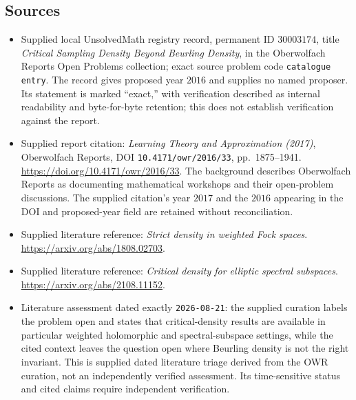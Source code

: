 \documentclass[11pt]{article}
\begin{document}
\subsection{Sources}
\begin{itemize}
\item Supplied local UnsolvedMath registry record, permanent ID \(30003174\), title \emph{Critical Sampling Density Beyond Beurling Density}, in the Oberwolfach Reports Open Problems collection; exact source problem code \texttt{catalogue entry}. The record gives proposed year \(2016\) and supplies no named proposer. Its statement is marked ``exact,'' with verification described as internal readability and byte-for-byte retention; this does not establish verification against the report.
\item Supplied report citation: \emph{Learning Theory and Approximation (2017)}, Oberwolfach Reports, DOI \texttt{10.4171/owr/2016/33}, pp.\ 1875--1941. \url{https://doi.org/10.4171/owr/2016/33}. The background describes Oberwolfach Reports as documenting mathematical workshops and their open-problem discussions. The supplied citation's year \(2017\) and the \(2016\) appearing in the DOI and proposed-year field are retained without reconciliation.
\item Supplied literature reference: \emph{Strict density in weighted Fock spaces}. \url{https://arxiv.org/abs/1808.02703}.
\item Supplied literature reference: \emph{Critical density for elliptic spectral subspaces}. \url{https://arxiv.org/abs/2108.11152}.
\item Literature assessment dated exactly \texttt{2026-08-21}: the supplied curation labels the problem open and states that critical-density results are available in particular weighted holomorphic and spectral-subspace settings, while the cited context leaves the question open where Beurling density is not the right invariant. This is supplied dated literature triage derived from the OWR curation, not an independently verified assessment. Its time-sensitive status and cited claims require independent verification.
\end{itemize}
\end{document}
